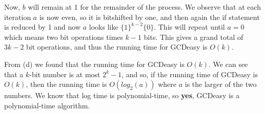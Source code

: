 \documentclass[12pt]{article}
\begin{document}
\begin{list}{.}{}
\begin{list}{)}{}
Now, $b$ will remain at 1 for the remainder of the process.  We observe that at
each iteration $a$ is now even, so it is bitshifted by one, and then again the
if statement is reduced by 1 and now $a$ looks like $\{1\}^{k-2}\{0\}$.  This
will repeat until $a = 0$ which means two bit operations times $k-1$ bits.  This
gives a grand total of $3k-2$ bit operations, and thus the running time for
GCDeasy is $O(k)$.

\item From (d) we found that the running time for GCDeasy is $O(k)$.  We can see
that a $k$-bit number is at most $2^k-1$, and so, if the running time of GCDeasy
is $O(k)$, then the running time is $O(log_2(a))$ where $a$ is the larger of the
two numbers.  We know that log time is polynomial-time, so \textbf{yes}, GCDeasy
is a polynomial-time algorithm.

\end{list}

\end{list}
\end{document}
